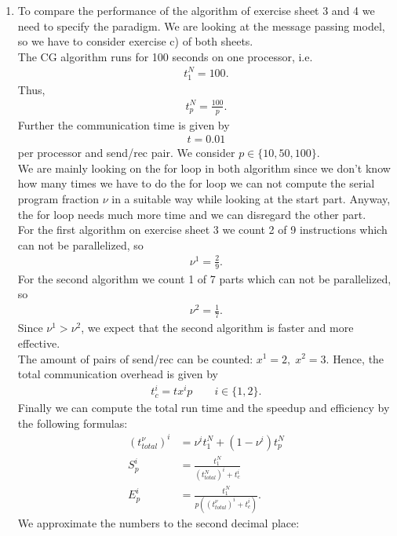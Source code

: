 \documentclass{article}
\begin{document}
\begin{enumerate}[label=(\alph*)]
\item To compare the performance of the algorithm of exercise sheet 3 and 4 we need to specify the paradigm. We are looking at the message passing model, so we have to consider exercise c) of both sheets.
\\
The CG algorithm runs for 100 seconds on one processor, i.e. 
\begin{align*}
    t_1^N=100.
\end{align*}
Thus,
\begin{align*}
    t_p^N=\frac{100}{p}.
\end{align*}
Further the communication time is given by
\begin{align*}
    t=0.01
\end{align*}
per processor and send/rec pair. We consider $p\in\{10,50,100\}$.
\\
We are mainly looking on the for loop in both algorithm since we don't know how many times we have to do the for loop we can not compute the serial program fraction $\nu$ in a suitable way while looking at the start part. Anyway, the for loop needs much more time and we can disregard the other part.
\\
For the first algorithm on exercise sheet 3 we count 2 of 9 instructions which can not be parallelized, so 
\begin{align*}
    \nu^1=\frac{2}{9}.
\end{align*}
For the second algorithm we count 1 of 7 parts which can not be parallelized, so
\begin{align*}
    \nu^2=\frac{1}{7}.
\end{align*}
Since $\nu^1>\nu^2$, we expect that the second algorithm is faster and more effective.
\\
The amount of pairs of send/rec can be counted: $x^1=2,\;x^2=3$. Hence, the total communication overhead is given by
\begin{align*}
    t^i_c=tx^ip\qquad i\in\{1,2\}.
\end{align*}
Finally we can compute the total run time and the speedup and efficiency by the following formulas:
\begin{align*}
    (t_{total}^\nu)^i&= \nu^i t_1^N +(1-\nu^i)t_p^N\\
    S_p^i &= \frac{t_1^N}{(t_{total}^N)^i+t_c^i}\\
    E_p^i &= \frac{t_1^N}{p((t_{total}^\nu)^i+t_c^i)}.
\end{align*}
We approximate the numbers to the second decimal place:
    \begin{center}

\end{center}
\end{enumerate}
\end{document}
